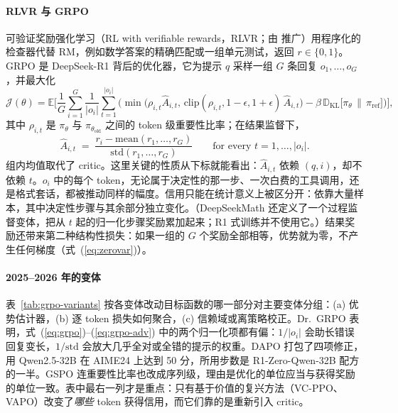 \paragraph{RLVR 与 GRPO}
可验证奖励强化学习（RL with verifiable rewards，RLVR；由 \citealp{lambert2024tulu} 推广）用程序化的检查器代替 RM，例如数学答案的精确匹配或一组单元测试，返回 $r\in\{0,1\}$。GRPO \citep{shao2024deepseekmath} 是 DeepSeek-R1 \citep{deepseekai2025deepseek} 背后的优化器，它为提示 $q$ 采样一组 $G$ 条回复 $o_1,\dots,o_G$，并最大化
\begin{equation}\label{eq:grpo}
\mathcal{J}(\theta)=\mathbb{E}\Bigg[\frac{1}{G}\sum_{i=1}^{G}\frac{1}{|o_i|}\sum_{t=1}^{|o_i|}\Big(\min\big(\rho_{i,t}\hat A_{i,t},\,\mathrm{clip}(\rho_{i,t},1-\epsilon,1+\epsilon)\,\hat A_{i,t}\big)-\beta\,\mathbb{D}_{\mathrm{KL}}\big[\pi_\theta\,\|\,\pi_{\mathrm{ref}}\big]\Big)\Bigg],
\end{equation}
其中 $\rho_{i,t}$ 是 $\pi_\theta$ 与 $\pi_{\theta_{\mathrm{old}}}$ 之间的 token 级重要性比率；在结果监督下，
\begin{equation}\label{eq:grpo-adv}
\hat A_{i,t}\;=\;\frac{r_i-\mathrm{mean}(r_1,\dots,r_G)}{\mathrm{std}(r_1,\dots,r_G)}\qquad\text{for every } t=1,\dots,|o_i|.
\end{equation}
组内均值取代了 critic。这里关键的性质从下标就能看出：$\hat A_{i,t}$ 依赖 $(q,i)$，却不依赖 $t$。$o_i$ 中的每个 token，无论属于决定性的那一步、一次白费的工具调用，还是格式套话，都被推动同样的幅度。信用只能在统计意义上被区分开：依靠大量样本，其中决定性步骤与其余部分独立变化。（DeepSeekMath 还定义了一个过程监督变体，把从 $t$ 起的归一化步骤奖励累加起来\unverified；R1 式训练并不使用它。）结果奖励还带来第二种结构性损失：如果一组的 $G$ 个奖励全部相等，优势就为零，不产生任何梯度（式~(\ref{eq:zerovar})）。

\paragraph{2025--2026 年的变体}
表~\ref{tab:grpo-variants} 按各变体改动目标函数的哪一部分对主要变体分组：(a) 优势估计器，(b) 逐 token 损失如何聚合，(c) 信赖域或离策略校正。Dr.~GRPO \citep{liu2025understanding} 表明，式~(\ref{eq:grpo})--(\ref{eq:grpo-adv}) 中的两个归一化项都有偏：$1/|o_i|$ 会助长错误回复变长，$1/\mathrm{std}$ 会放大几乎全对或全错的提示的权重。DAPO \citep{yu2025dapo} 打包了四项修正，用 Qwen2.5-32B 在 AIME24 上达到 50 分，所用步数是 R1-Zero-Qwen-32B 配方的一半。GSPO \citep{zheng2025group} 连重要性比率也改成序列级，理由是优化的单位应当与获得奖励的单位一致。表中最右一列才是重点：只有基于价值的复兴方法（VC-PPO、VAPO）改变了\emph{哪些} token 获得信用，而它们靠的是重新引入 critic。

